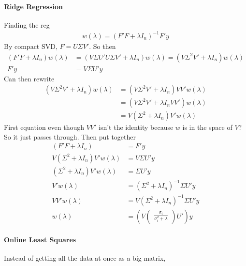 \documentclass[12pt]{article}
\numberwithin{equation}{section} %
\theoremstyle{plain}
\theoremstyle{definition}
\theoremstyle{remark}
\begin{document}
\paragraph{Ridge Regression}
Finding the reg
\begin{align*}
  w(\lambda)
  = (F'F+\lambda I_n)^{-1}F'y
\end{align*}
By compact SVD, $F=U\Sigma V'$.
So then
\begin{align*}
  (F'F+\lambda I_n)
  w(\lambda)
  &=
  (V\Sigma U'U\Sigma V'+\lambda I_n) w(\lambda)
  =
  (V\Sigma^2 V'+\lambda I_n) w(\lambda)
  \\
  F'y
  &= V\Sigma U'y
\end{align*}
Can then rewrite
\begin{align*}
  (V\Sigma^2 V'+\lambda I_n) w(\lambda)
  &= (V\Sigma^2 V'+\lambda I_n) VV'w(\lambda)
  \\
  &= (V\Sigma^2 V'+\lambda I_n VV') w(\lambda)
  \\
  &= V(\Sigma^2 +\lambda I_n )V' w(\lambda)
\end{align*}
First equation even though $VV'$ isn't the identity because $w$ is in
the space of $V$?  So it just passes through.
Then put together
\begin{align*}
  (F'F+\lambda I_n)
  &=
  F'y
  \\
  V(\Sigma^2 +\lambda I_n )V' w(\lambda)
  &= V\Sigma U'y
  \\
  (\Sigma^2 +\lambda I_n )V' w(\lambda)
  &= \Sigma U'y
  \\
  V' w(\lambda)
  &= (\Sigma^2 +\lambda I_n )^{-1}\Sigma U'y
  \\
  VV' w(\lambda)
  &= V(\Sigma^2 +\lambda I_n )^{-1}\Sigma U'y
  \\
  w(\lambda)
  &=
  \left(
    V
    \begin{pmatrix}
      \frac{\sigma_i}{\sigma_i^2+\lambda}
    \end{pmatrix}
    U'
  \right)y
\end{align*}
\paragraph{Online Least Squares}
Instead of getting all the data at once as a big matrix,
\end{document}
